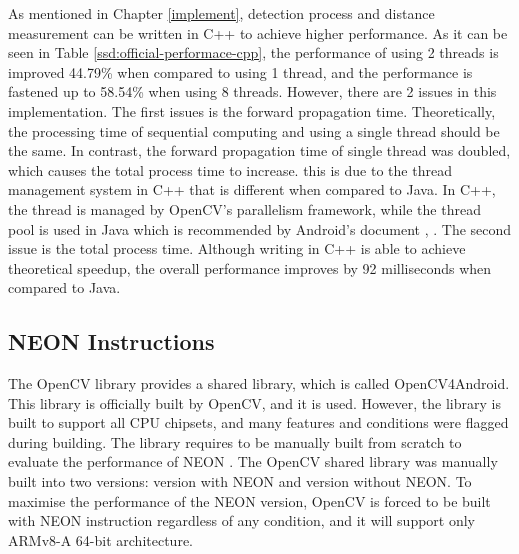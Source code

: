             As mentioned in Chapter \ref{implement},
            detection process and distance measurement can be written in C++ to achieve higher performance.
            As it can be seen in Table \ref{ssd:official-performace-cpp},
            the performance of using 2 threads is improved 44.79\% when compared to using 1 thread,
            and the performance is fastened up to 58.54\% when using 8 threads.
            However, there are 2 issues in this implementation.
            The first issues is the forward propagation time.
                Theoretically, the processing time of sequential computing and using a single thread should be the same.
                In contrast, the forward propagation time of single thread was doubled,
                which causes the total process time to increase.
                this is due to the thread management system in C++ that is different when compared to Java.
                In C++, the thread is managed by OpenCV's parallelism framework, while
                the thread pool is used in Java which is recommended by Android's document \cite{ANDROID-01}, \cite{opencv_library}.
            The second issue is the total process time.
                Although writing in C++ is able to achieve theoretical speedup,
                the overall performance improves by 92 milliseconds when compared to Java.

        \subsection{NEON Instructions}
            The OpenCV library provides a shared library, which is called OpenCV4Android.
            This library is officially built by OpenCV, and it is used.
            However, the library is built to support all CPU chipsets, and many features and conditions were flagged during building.
            The library requires to be manually built from scratch to evaluate the performance of NEON \cite{NEON-ARM}.
            The OpenCV shared library was manually built into two versions: version with NEON and version without NEON.
            To maximise the performance of the NEON version, OpenCV is forced to be built with NEON instruction regardless of any condition,
            and it will support only ARMv8-A 64-bit architecture.

